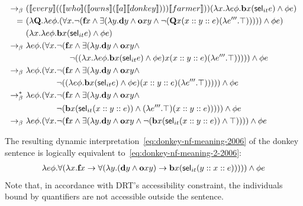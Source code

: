 \begin{example}
\begin{align}
\bconv \ &   (\trr{\I{every}}  ((\trr{\I{who}}  (\trr{\I{owns}}  (\trr{\I{a}}  \trr{\I{donkey}} ) ) ) \trr{\I{farmer}}  ))  ( \lambda \x1. \lambda e \phi.   \cbeat \x1  ( \sel_{it} e)  \land \phi e ) \notag \\
= \ &    ( \lambda  \Q2. \lambda e \phi. (\forall \x1. \neg ( \cfarmer \x1 \land   \exists (\lambda \y1.  \cdonkey \y1  \land  \cown \x1 \y1 \land  \neg (\Q2 \x1 (\upii{\x1}{\upii{\y1}{e}})  (\lambda e'''. \top)  ) ) ))  \land \phi e ) \notag \\
&  ( \lambda \x1. \lambda e \phi.   \cbeat \x1  ( \sel_{it} e)  \land \phi e ) \notag \\
\bconv \ &    \lambda e \phi. (\forall \x1. \neg ( \cfarmer \x1 \land   \exists (\lambda \y1.  \cdonkey \y1  \land  \cown \x1 \y1 \land \notag \\
& \phantom{aaaaaaaaaa}  \neg (( \lambda \x1. \lambda e \phi.   \cbeat \x1  ( \sel_{it} e)  \land \phi e ) \x1 (\upii{\x1}{\upii{\y1}{e}})  (\lambda e'''. \top)  ) ) ))  \land \phi e    \notag \\
\bconv \ &  \lambda e \phi. (\forall \x1. \neg ( \cfarmer \x1 \land   \exists (\lambda \y1.  \cdonkey \y1  \land  \cown \x1 \y1 \land \notag \\
& \phantom{aaaaaaa} \neg (( \lambda e \phi.   \cbeat \x1  ( \sel_{it} e)  \land \phi e ) (\upii{\x1}{\upii{\y1}{e}})  (\lambda e'''. \top)  ) ) ))  \land \phi e    \notag \\
\bred \ &  \lambda e \phi. (\forall \x1. \neg ( \cfarmer \x1 \land   \exists (\lambda \y1.  \cdonkey \y1  \land  \cown \x1 \y1 \land \notag \\
& \phantom{aaaaaaa} \neg (  \cbeat \x1  ( \sel_{it}  (\upii{\x1}{\upii{\y1}{e}}))  \land (\lambda e'''. \top)  (\upii{\x1}{\upii{\y1}{e}})   ) ) ))  \land \phi e    \notag \\
\bconv \ &\lambda e \phi. (\forall \x1. \neg ( \cfarmer \x1 \land   \exists (\lambda \y1.  \cdonkey \y1  \land  \cown \x1 \y1 \land  \neg (  \cbeat \x1  ( \sel_{it}  (\upii{\x1}{\upii{\y1}{e}}))  \land  \top  ) ) ))  \land \phi e     \label{eq:donkey-nf-meaning-2006}
\end{align}

The resulting dynamic interpretation~\eqref{eq:donkey-nf-meaning-2006} of the donkey sentence is logically equivalent to~\eqref{eq:donkey-nf-meaning-2-2006}:
\begin{align}
 \lambda e \phi. \forall ( \lambda \x1.  \cfarmer \x1  \rightarrow    \forall ( \lambda \y1.  ( \cdonkey \y1 \land  \cown \x1 \y1 ) \rightarrow   \cbeat \x1  ( \sel_{it} (\y1 :: \x1 :: e))  )  ) )  \land \phi e  \label{eq:donkey-nf-meaning-2-2006}
\end{align}
Note that, in accordance with DRT's accessibility constraint, the individuals bound by quantifiers are not accessible outside the sentence. 
\end{example}

